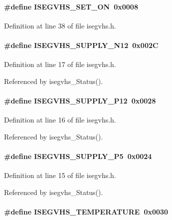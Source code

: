 \paragraph[{ISEGVHS\_\-SET\_\-ON}]{\setlength{\rightskip}{0pt plus 5cm}\#define ISEGVHS\_\-SET\_\-ON~0x0008}\hfill\label{isegvhs_8h_a5014258716225fc4c9ed9f3bfcbccd1b}


Definition at line 38 of file isegvhs.h.
\paragraph[{ISEGVHS\_\-SUPPLY\_\-N12}]{\setlength{\rightskip}{0pt plus 5cm}\#define ISEGVHS\_\-SUPPLY\_\-N12~0x002C}\hfill\label{isegvhs_8h_a0b447fbc87785916f0d754183b51dada}


Definition at line 17 of file isegvhs.h.

Referenced by isegvhs\_\-Status().
\paragraph[{ISEGVHS\_\-SUPPLY\_\-P12}]{\setlength{\rightskip}{0pt plus 5cm}\#define ISEGVHS\_\-SUPPLY\_\-P12~0x0028}\hfill\label{isegvhs_8h_aa89fcda5b252e0400b93cc3b6c2bb160}


Definition at line 16 of file isegvhs.h.

Referenced by isegvhs\_\-Status().
\paragraph[{ISEGVHS\_\-SUPPLY\_\-P5}]{\setlength{\rightskip}{0pt plus 5cm}\#define ISEGVHS\_\-SUPPLY\_\-P5~0x0024}\hfill\label{isegvhs_8h_a0265da4662f466dc1f8c4ea9f92a8933}


Definition at line 15 of file isegvhs.h.

Referenced by isegvhs\_\-Status().
\paragraph[{ISEGVHS\_\-TEMPERATURE}]{\setlength{\rightskip}{0pt plus 5cm}\#define ISEGVHS\_\-TEMPERATURE~0x0030}\hfill\label{isegvhs_8h_add818d5e367f54ce631915dc73078ff1}


